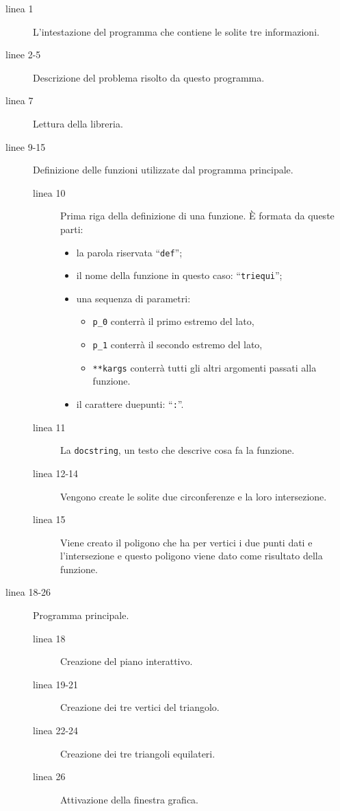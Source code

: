 \begin{description}
 \item [linea 1] 
 L'intestazione del programma che contiene le solite tre informazioni.
 \item [linee 2-5]
 Descrizione del problema risolto da questo programma.
 \item [linea 7]
 Lettura della libreria.
 \item [linee 9-15]
 Definizione delle funzioni utilizzate dal programma principale.
\begin{description}
 \item [linea 10]
 Prima riga della definizione di una funzione. È formata da queste parti:
 \begin{itemize} [nosep]
  \item la parola riservata ``\lstinline{def}'';
  \item il nome della funzione in questo caso: ``\lstinline{triequi}'';
  \item una sequenza di parametri:
  \begin{itemize}
   \item \lstinline{p_0} conterrà il primo estremo del lato,
   \item \lstinline{p_1} conterrà il secondo estremo del lato,
   \item \lstinline{**kargs} conterrà tutti gli altri argomenti passati alla 
funzione.
  \end{itemize}
  \item il carattere duepunti: ``\lstinline{:}''.
  \end{itemize}
 \item [linea 11]
 La \lstinline{docstring}, un testo che descrive cosa fa la funzione.
 \item [linea 12-14]
 Vengono create le solite due circonferenze e la loro intersezione.
 \item [linea 15]
 Viene creato il poligono che ha per vertici i due punti dati e l'intersezione 
e questo poligono viene dato come risultato della funzione.
\end{description}
 \item [linea 18-26]
 Programma principale.
\begin{description}
 \item [linea 18]
 Creazione del piano interattivo.
 \item [linea 19-21]
 Creazione dei tre vertici del triangolo.
 \item [linea 22-24]
 Creazione dei tre triangoli equilateri.
 \item [linea 26]
 Attivazione della finestra grafica.
\end{description}
\end{description}

